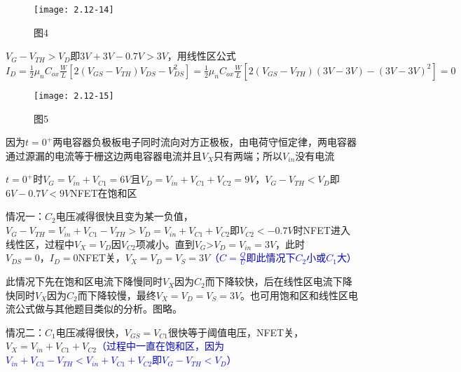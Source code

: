		\begin{figure}[H] %
	\begin{minipage}{\linewidth}
		\texttt{[image: 2.12-14]}
	\end{minipage}
	\caption*{图4} %
\end{figure}

\scalebox{3}{（c）}

$V_G-V_{TH}>V_{D}$即$3V+3V-0.7V>3V$，用线性区公式$I_D=\frac{1}{2}\mu_nC_{ox}\frac{W}{L}[2(V_{GS}-V_{TH})V_{DS}-V_{DS}^2]=\frac{1}{2}\mu_nC_{ox}\frac{W}{L}[2(V_{GS}-V_{TH})(3V-3V)-(3V-3V)^2]=0$

		\begin{figure}[H] %
	\begin{minipage}{\linewidth}
		\texttt{[image: 2.12-15]}
	\end{minipage}
	\caption*{图5} %
\end{figure}

\scalebox{3}{（d）}

因为$t=0^+$两电容器负极板电子同时流向对方正极板，由电荷守恒定律，两电容器通过源漏的电流等于栅这边两电容器电流并且$V_X$只有两端；所以$V_{in}$没有电流

$t=0^+$时$V_G=V_{in}+V_{C1}=6V$且$V_D=V_{in}+V_{C1}+V_{C2}=9V$，$V_G-V_{TH}<V_{D}$即$6V-0.7V<9V$NFET在饱和区

\scalebox{2}{（1）}

情况一：$C_2$电压减得很快且变为某一负值，$V_G-V_{TH}=V_{in}+V_{C1}-V_{TH}>V_D=V_{in}+V_{C1}+V_{C2}$即$V_{C2}<-0.7V$时NFET进入线性区，过程中$V_X=V_D$因$V_{C2}$项减小。直到$V_G$>$V_D=V_{in}=3V$，此时$V_{DS}=0，I_D=0$NFET关，$V_X=V_D=V_S=3V$\textcolor{blue}{（$C=\frac{Q}{U}$即此情况下$C_2$小或$C_1$大）}

此情况下先在饱和区电流下降慢同时$V_X$因为$C_2$而下降较快，后在线性区电流下降快同时$V_X$因为$C_2$而下降较慢，最终$V_X=V_D=V_S=3V$。也可用饱和区和线性区电流公式做与其他题目类似的分析。图略。

\scalebox{2}{（2）}

情况二：$C_1$电压减得很快，$V_{GS}=V_{C1}$很快等于阈值电压，NFET关，$V_X=V_{in}+V_{C1}+V_{C2}$\textcolor{blue}{（过程中一直在饱和区，因为$V_{in}+V_{C1}-V_{TH}<V_{in}+V_{C1}+V_{C2}$即$V_G-V_{TH}<V_{D}$）}








